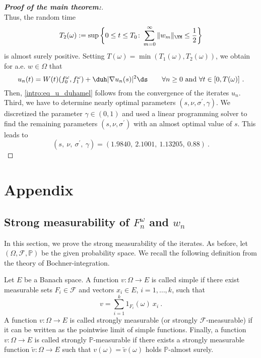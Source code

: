 \documentclass[11pt]{article}
\begin{document}
\begin{proof}[\textbf{Proof of the main theorem:}]
\begin{equation*}
\end{equation*}
Thus, the random time 
\begin{equation*}
T_2(\omega) := \sup \bigg \{ 0\leq t \leq T_0\colon \sum_{m=0}^\infty \| w_m \|_{\YM} \leq \frac{1}{2} \bigg\}
\end{equation*}
is almost surely positive. Setting \( T(\omega) = \min( T_1(\omega), T_2(\omega) ) \), we obtain for a.e. \( w\in \Omega \) that 
\begin{equation*}
u_n(t)= W(t) (f_0^\omega, f_1^\omega) + \duh |\nabla u_n(s)|^2 \ds \qquad  \forall n\geq 0 ~ \text{and} ~\forall t \in [0,T(\omega)]   ~ . 
\end{equation*} 
Then, \eqref{intro:eq_u_duhamel} follows from the convergence of the iterates \( u_n \). \\

Third, we have to determine nearly optimal parameters \( (s,\nu,\sigma^\prime,\gamma) \). We discretized the parameter \( \gamma \in (0,1) \) and used a linear programming solver to find the remaining parameters  \( (s,\nu,\sigma^\prime ) \) with an almost optimal value of \( s \). This leads to 
\begin{equation}\label{fin:eq_parameters}
(s,~ \nu,~ \sigma^\prime,~ \gamma ) = (1.9840,~ 2.1001,~ 1.13205,~ 0.88 )~.
\end{equation}
\end{proof}\vspace{-4ex}

\appendix
\section{Appendix}
\subsection*{Strong measurability of \( F_n^\omega \) and \( w_n \)}

In this section, we prove the strong measurability of the iterates. As before, let \( (\Omega, \mathscr{F},\mathbb{P} ) \) be the given probability space. We recall the following definition from the theory of Bochner-integration.
\begin{definition}
Let \( E \) be a Banach space. A function \( v\colon \Omega \rightarrow E \)  is called simple if there exist measurable sets \( F_i \in \mathscr{F} \) and vectors \( x_i \in E \), \( i=1,\hdots,k \), such that
\begin{equation*}
v= \sum_{i=1}^k 1_{F_i}(\omega) ~ x_i ~. 
\end{equation*}
A function \( v\colon \Omega \rightarrow E \)  is called strongly measurable (or strongly \( \mathscr{F}\)-measurable) if it can be written as the pointwise limit of simple functions. Finally, a function \( v\colon \Omega \rightarrow E \) is called strongly \( \mathbb{P}\)-measurable if there exists a strongly measurable function \( \widetilde{v} \colon \Omega \rightarrow E \) such that \( v (\omega)= \widetilde{v}(\omega) \) holds \( \mathbb{P}\)-almost surely. 
\end{definition}
\end{document}

